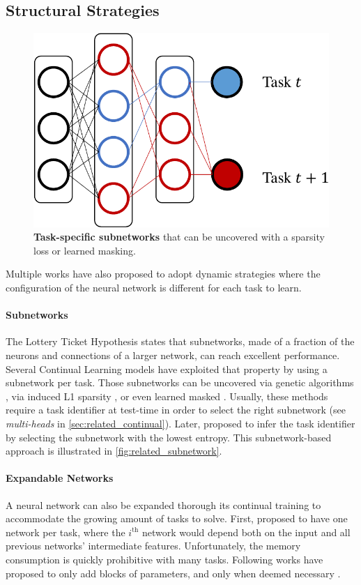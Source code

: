 \subsection{Structural Strategies}
\label{sec:related_structural}

\begin{figure}[tb]
      \begin{center}
            \includegraphics[width=0.6\linewidth]{images/related/subnetworks.pdf}
      \end{center}
      \caption{\textbf{Task-specific subnetworks} that can be uncovered with a sparsity loss or
            learned masking.}
      \label{fig:related_subnetwork}
\end{figure}

Multiple works have also proposed to adopt dynamic strategies where the configuration of the neural
network is different for each task to learn.

\paragraph{Subnetworks} The Lottery Ticket Hypothesis \citep{frankle2019lottery_ticket} states that
subnetworks, made of a fraction of the neurons and connections of a larger network, can reach
excellent performance. Several Continual Learning models have exploited that property by using a
subnetwork per task. Those subnetworks can be uncovered via genetic algorithms
\citep{fernando2017path_net}, via induced L1 sparsity \citep{golkar2019neural_pruning}, or even
learned masked \cite{serra2018hat,hung2019cpg}. Usually, these methods require a task identifier at
test-time in order to select the right subnetwork (see \textit{multi-heads} in
\autoref{sec:related_continual}). Later, \cite{wortsman2020supermasks} proposed to infer the task
identifier by selecting the subnetwork with the lowest entropy. This subnetwork-based approach is
illustrated in \autoref{fig:related_subnetwork}.

\paragraph{Expandable Networks} A neural network can also be expanded thorough its continual
training to accommodate the growing amount of tasks to solve. First, \cite{rusu2016progressive}
proposed to have one network per task, where the $i^{\text{th}}$ network would depend both on the
input and all previous networks' intermediate features. Unfortunately, the memory consumption is
quickly prohibitive with many tasks. Following works have proposed to only add blocks of parameters,
and only when deemed necessary
\citep{hung2019cpg,veniat2021mntdp,ostapenko2021localmodulecomposition}.

